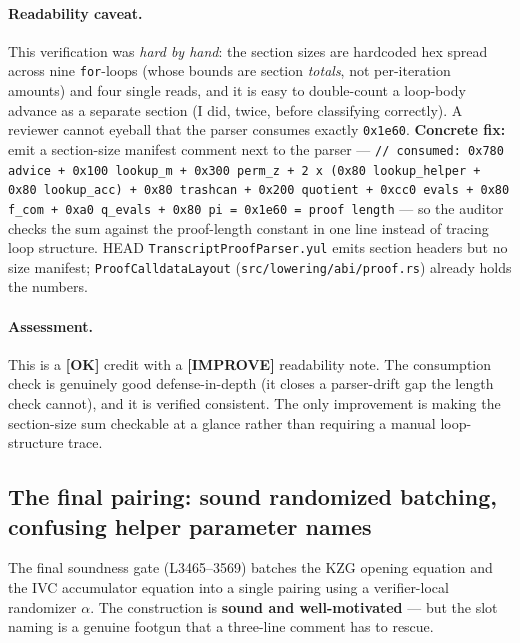 \paragraph{Readability caveat.}
This verification was \emph{hard by hand}: the section sizes are
hardcoded hex spread across nine \texttt{for}-loops (whose
bounds are section \emph{totals}, not per-iteration amounts) and
four single reads, and it is easy to double-count a loop-body
advance as a separate section (I did, twice, before classifying
correctly). A reviewer cannot eyeball that the parser consumes
exactly \texttt{0x1e60}. \textbf{Concrete fix:} emit a
section-size manifest comment next to the parser ---
\texttt{/\allowbreak{}/\allowbreak{} consumed: 0x780 advice + 0x100 lookup\_\allowbreak{}m + 0x300
perm\_\allowbreak{}z + 2 x (0x80 lookup\_\allowbreak{}helper + 0x80 lookup\_\allowbreak{}acc) + 0x80
trashcan + 0x200 quotient + 0xcc0 evals + 0x80 f\_\allowbreak{}com + 0xa0
q\_\allowbreak{}evals + 0x80 pi = 0x1e60 = proof length} --- so the auditor
checks the sum against the proof-length constant in one line
instead of tracing loop structure.  HEAD
\texttt{TranscriptProofParser.yul} emits section headers but no
size manifest; \texttt{ProofCalldataLayout}
(\texttt{src/\allowbreak{}lowering/\allowbreak{}abi/\allowbreak{}proof.rs}) already holds the numbers.

\paragraph{Assessment.} This is a
\textcolor{tracegreen}{\textbf{[OK]}} credit with a
\textcolor{codegenblue}{\textbf{[IMPROVE]}} readability note.
The consumption check is genuinely good defense-in-depth (it
closes a parser-drift gap the length check cannot), and it is
verified consistent. The only improvement is making the
section-size sum checkable at a glance rather than requiring a
manual loop-structure trace.

\subsection{The final pairing: sound randomized batching, confusing helper parameter names}
\label{sec:pr-final-pairing}

The final soundness gate (L3465--3569) batches the KZG opening
equation and the IVC accumulator equation into a single pairing
using a verifier-local randomizer $\alpha$. The construction is
\textbf{sound and well-motivated} --- but the slot naming is a
genuine footgun that a three-line comment has to rescue.

